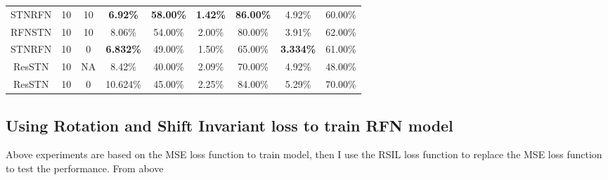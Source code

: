 \begin{table}[h]
\begin{tabular}{ccccccccc}
    STNRFN & 10  &10  & \textbf{6.92\%} & \textbf{58.00\%}                                                                         & \textbf{1.42\%} & \textbf{86.00\%}                                                                         & 4.92\%          & 60.00\%                                                                                  \\
    RFNSTN & 10 &10   & 8.06\%          & 54.00\%                                                                                  & 2.00\%          & 80.00\%                                                                                  & 3.91\% & 62.00\%              
    \\
    STNRFN & 10 &0   & \textbf{6.832\%}          & 49.00\%                                                                                  & 1.50\%          & 65.00\%                                                                                  & \textbf{3.334\%} & 61.00\%           
    \\
    ResSTN  & 10 &NA   & 8.42\%          & 40.00\%                                                                                  & 2.09\%          & 70.00\%                                                                                  & 4.92\% & 48.00\%      
    \\
    ResSTN & 10 &0   & 10.624\%          & 45.00\%                                                                                  & 2.25\%          & 84.00\%                                                                                  & 5.29\% & 70.00\%                                                                     \\ \hline
    \end{tabular}
    \label{stn}
\end{table}

\subsection{Using Rotation and Shift Invariant loss to train RFN model}
Above experiments are based on the MSE loss function to train model, then I use the RSIL loss function to replace the MSE loss function to test the performance. From above 

